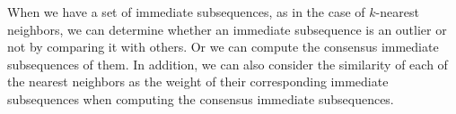 \noindent{} When we have a set of immediate subsequences, as in the case of $k$-nearest neighbors, we can determine whether an immediate subsequence is an outlier or not by comparing it with others.
Or we can compute the consensus immediate subsequences of them.
In addition, we can also consider the similarity of each of the nearest neighbors as the weight of their corresponding immediate subsequences when computing the consensus immediate subsequences.

